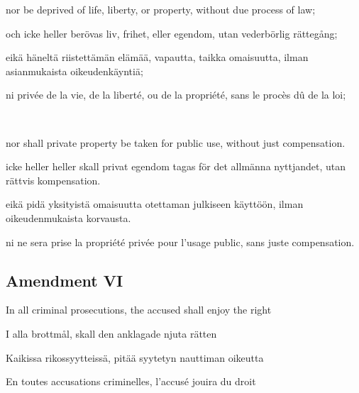 \documentclass[a4paper,landscape,12pt]{article}
\begin{document}
\begin{minipage}[t]{0.22\textwidth}
nor be deprived of life, liberty, or property, without due process of law;
\end{minipage}\textwidth
\begin{minipage}[t]{0.22\textwidth}
och icke heller berövas liv, frihet, eller egendom, utan vederbörlig rättegång;
\end{minipage}\textwidth
\begin{minipage}[t]{0.22\textwidth}
eikä häneltä riistettämän elämää, vapautta, taikka omaisuutta, ilman asianmukaista oikeudenkäyntiä;
\end{minipage}\textwidth
\begin{minipage}[t]{0.22\textwidth}
ni privée de la vie, de la liberté, ou de la propriété, sans le procès dû de la loi;
\end{minipage}

~

\begin{minipage}[t]{0.22\textwidth}
nor shall private property be taken for public use, without just compensation.
\end{minipage}\textwidth
\begin{minipage}[t]{0.22\textwidth}
icke heller heller skall privat egendom tagas för det allmänna nyttjandet, utan rättvis kompensation.
\end{minipage}\textwidth
\begin{minipage}[t]{0.22\textwidth}
eikä pidä yksityistä omaisuutta otettaman julkiseen käyttöön, ilman oikeudenmukaista korvausta.
\end{minipage}\textwidth
\begin{minipage}[t]{0.22\textwidth}
ni ne sera prise la propriété privée pour l'usage public, sans juste compensation.
\end{minipage}



\subsection*{Amendment VI}
\begin{minipage}[t]{0.22\textwidth}
In all criminal prosecutions, the accused shall enjoy the right
\end{minipage}\textwidth
\begin{minipage}[t]{0.22\textwidth}
I alla brottmål, skall den anklagade njuta rätten
\end{minipage}\textwidth
\begin{minipage}[t]{0.22\textwidth}
Kaikissa rikossyytteissä, pitää syytetyn nauttiman oikeutta
\end{minipage}\textwidth
\begin{minipage}[t]{0.22\textwidth}
En toutes accusations criminelles, l'accusé jouira du droit
\end{minipage}
\end{document}
